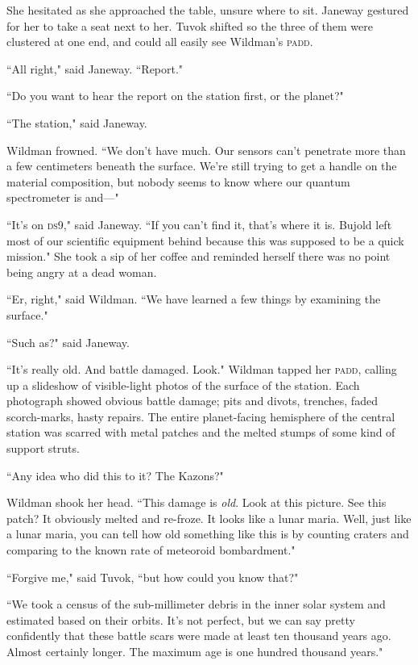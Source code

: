 \documentclass[twoside,letterpaper,12pt]{memoir}
\begin{document}
She hesitated as she approached the table, unsure where to sit. Janeway gestured for her to take a seat next to her. Tuvok shifted so the three of them were clustered at one end, and could all easily see Wildman's \textsc{padd}.

``All right," said Janeway. ``Report."

``Do you want to hear the report on the station first, or the planet?"

``The station," said Janeway.

Wildman frowned. ``We don't have much. Our sensors can't penetrate more than a few centimeters beneath the surface. We're still trying to get a handle on the material composition, but nobody seems to know where our quantum spectrometer is and---"

``It's on \textsc{ds9}," said Janeway. ``If you can't find it, that's where it is. Bujold left most of our scientific equipment behind because this was supposed to be a quick mission." She took a sip of her coffee and reminded herself there was no point being angry at a dead woman.

``Er, right," said Wildman. ``We have learned a few things by examining the surface."

``Such as?" said Janeway.

``It's really old. And battle damaged. Look." Wildman tapped her \textsc{padd}, calling up a slideshow of visible-light photos of the surface of the station. Each photograph showed obvious battle damage; pits and divots, trenches, faded scorch-marks, hasty repairs. The entire planet-facing hemisphere of the central station was scarred with metal patches and the melted stumps of some kind of support struts.

``Any idea who did this to it? The Kazons?"

Wildman shook her head. ``This damage is \textit{old}. Look at this picture. See this patch? It obviously melted and re-froze. It looks like a lunar maria. Well, just like a lunar maria, you can tell how old something like this is by counting craters and comparing to the known rate of meteoroid bombardment."

``Forgive me," said Tuvok, ``but how could you know that?"

``We took a census of the sub-millimeter debris in the inner solar system and estimated based on their orbits. It's not perfect, but we can say pretty confidently that these battle scars were made at least ten thousand years ago. Almost certainly longer. The maximum age is one hundred thousand years."
\end{document}
